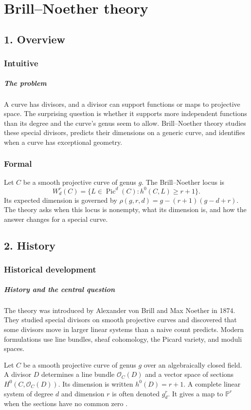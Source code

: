\clearpage\chapter{Brill--Noether theory}
\section*{1. Overview}
\subsection*{Intuitive}
\paragraph{The problem}

A curve has divisors, and a divisor can support functions or maps to projective space. The surprising question is whether it supports more independent functions than its degree and the curve's genus seem to allow. Brill--Noether theory studies these special divisors, predicts their dimensions on a generic curve, and identifies when a curve has exceptional geometry.



\subsection*{Formal}
Let $C$ be a smooth projective curve of genus $g$. The Brill--Noether locus is
\[
 W^r_d(C)=\{L\in\operatorname{Pic}^d(C):h^0(C,L)\ge r+1\}.
\]
Its expected dimension is governed by $\rho(g,r,d)=g-(r+1)(g-d+r)$. The theory asks when this locus is nonempty, what its dimension is, and how the answer changes for a special curve.
\section*{2. History}
\subsection*{Historical development}
\begin{historylist}
\paragraph{History and the central question}

The theory was introduced by Alexander von Brill and Max Noether in 1874. They studied special divisors on smooth projective curves and discovered that some divisors move in larger linear systems than a naive count predicts. Modern formulations use line bundles, sheaf cohomology, the Picard variety, and moduli spaces.

Let $C$ be a smooth projective curve of genus $g$ over an algebraically closed field. A divisor $D$ determines a line bundle $\mathcal O_C(D)$ and a vector space of sections $H^0(C,\mathcal O_C(D))$. Its dimension is written $h^0(D)=r+1$. A complete linear system of degree $d$ and dimension $r$ is often denoted $g^r_d$. It gives a map to $\mathbb P^r$ when the sections have no common zero \cite{brill_noether_theory_ref1,brill_noether_theory_ref3}.

\end{historylist}
